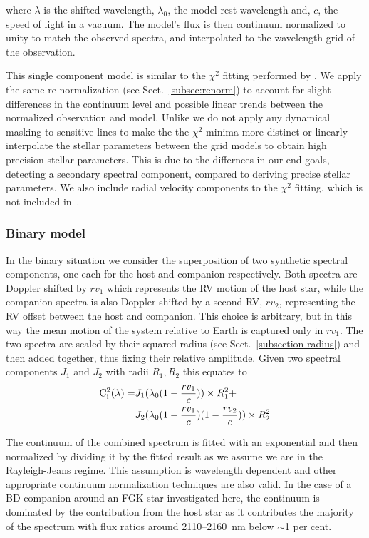 \documentclass[fleqn,usenatbib]{mnras}
\begin{document}
where \(\lambda\) is the shifted wavelength, \(\lambda_0\), the model rest wavelength and, \(c\), the speed of light in a vacuum. The model's flux is then continuum normalized to unity to match the observed spectra, and interpolated to the wavelength grid of the observation.

This single component model is similar to the \(\chi^2\) fitting performed by \citet{passegger_fundamental_2016}. We apply the same re-normalization (see Sect.~\ref{subsec:renorm}) to account for slight differences in the continuum level and possible linear trends between the normalized observation and model. Unlike \citet{passegger_fundamental_2016} we do not apply any dynamical masking to sensitive lines to make the the \(\chi^2\) minima more distinct or linearly interpolate the stellar parameters between the grid models to obtain high precision stellar parameters. This is due to the differnces in our end goals, detecting a secondary spectral component, compared to deriving precise stellar parameters. We also include radial velocity components to the \(\chi^2\) fitting, which is not included in~\citet{passegger_fundamental_2016}.

\subsubsection{Binary model}
\label{subsubsec:binary-model}
In the binary situation we consider the superposition of two synthetic spectral components, one each for the host and companion respectively. Both spectra are Doppler shifted by \({rv}_1\) which represents the RV motion of the host star, while the companion spectra is also Doppler shifted by a second RV, \({rv}_2\), representing the RV offset between the host and companion. This choice is arbitrary, but in this way the mean motion of the system relative to Earth is captured only in \({rv}_1\). The two spectra are scaled by their squared radius (see Sect.~\ref{subsection-radius}) and then added together, thus fixing their relative amplitude.
Given two spectral components \(J_{1}\) and \(J_{2}\) with radii \(R_1, R_2\) this equates to
\begin{align}
\rm C^{2}_{i}(\lambda) = &  J_{1}(\lambda_{0}(1 - \frac{rv_{1}}{c}))\times R_{1}^2 +\nonumber \\
& J_{2}(\lambda_{0}(1-\frac{rv_{1}}{c})(1-\frac{rv_{2}}{c}))\times R_{2}^2
\end{align}

The continuum of the combined spectrum is fitted with an exponential and then normalized by dividing it by the fitted result as we assume we are in the Rayleigh-Jeans regime. This assumption is wavelength dependent and other appropriate continuum normalization techniques are also valid. In the case of a BD companion around an FGK star investigated here, the continuum is dominated by the contribution from the host star as it contributes the majority of the spectrum with flux ratios around 2110--2160~nm below \(\sim\)1 per cent.
\end{document}
